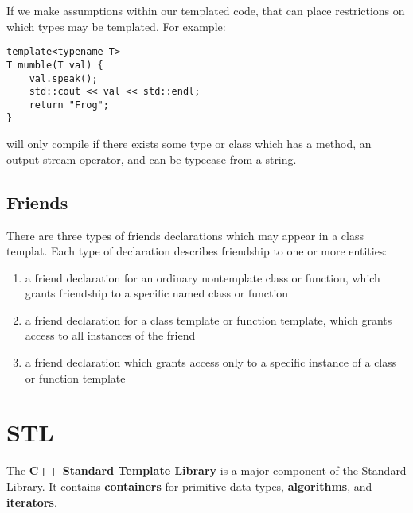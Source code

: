 \documentclass[12pt]{article}
\begin{document}
If we make assumptions within our templated code, that can place restrictions on which types may be templated. For example:
\begin{verbatim}
template<typename T>
T mumble(T val) {
    val.speak();
    std::cout << val << std::endl;
    return "Frog";
}
\end{verbatim}
will only compile if there exists some type or class which has a  method, an output stream operator, and can be typecase from a string.

\subsection{Friends}
There are three types of friends declarations which may appear in a class templat. Each type of declaration describes friendship to one or more entities:
\begin{enumerate}
\item a friend declaration for an ordinary nontemplate class or function, which grants friendship to a specific named class or function
\item a friend declaration for a class template or function template, which grants access to all instances of the friend
\item a friend declaration which grants access only to a specific instance of a class or function template
\end{enumerate}

\section{STL}
The {\bf C++ Standard Template Library} is a major component of the Standard Library. It contains {\bf containers} for primitive data types, {\bf algorithms}, and {\bf iterators}.
\end{document}
